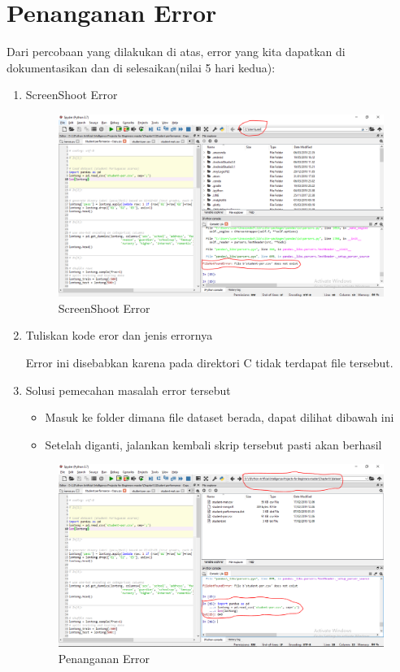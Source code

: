 \section{Penanganan Error}
Dari percobaan yang dilakukan di atas, error yang kita dapatkan di dokumentasikan dan di selesaikan(nilai 5 hari kedua):

\begin{enumerate}
	\item
ScreenShoot Error
\begin{figure}[ht]
\centering
\includegraphics[scale=0.3]{figures/lontong/13.png}
\caption{ScreenShoot Error}
\end{figure}
	\item
Tuliskan kode eror dan jenis errornya
\par
Error ini disebabkan karena pada direktori C tidak terdapat file tersebut. 
	\item
Solusi pemecahan masalah error tersebut
\begin{itemize}
\item 	Masuk ke folder dimana file dataset berada, dapat dilihat dibawah ini
\item 	Setelah diganti, jalankan kembali skrip tersebut pasti akan berhasil
\end{itemize}
\begin{figure}[ht]
\centering
\includegraphics[scale=0.3]{figures/lontong/14.png}
\caption{Penanganan Error}
\end{figure}

\end{enumerate}

